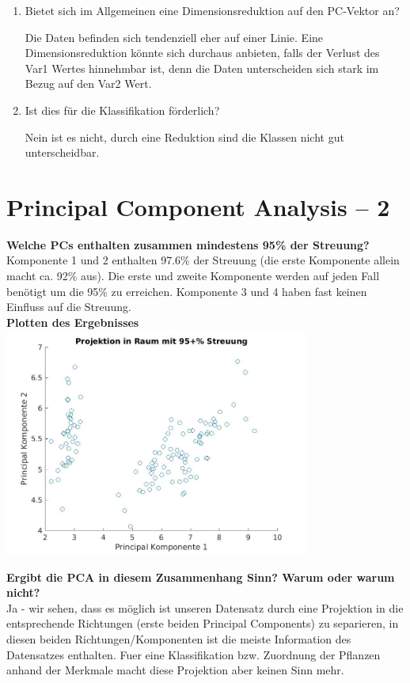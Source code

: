 \documentclass[a4paper]{scrartcl}
\begin{document}
\begin{enumerate}[(a)]
	\begin{enumerate}[1.]
		\item Bietet sich im Allgemeinen eine Dimensionsreduktion auf den PC-Vektor an?
		
		Die Daten befinden sich tendenziell eher auf einer Linie. Eine Dimensionsreduktion könnte sich durchaus anbieten, falls der Verlust des Var1 Wertes hinnehmbar ist, denn die Daten unterscheiden sich stark im Bezug auf den Var2 Wert.
		
		\item Ist dies für die Klassifikation förderlich?
		
		Nein ist es nicht, durch eine Reduktion sind die Klassen nicht gut unterscheidbar.
		
	\end{enumerate}
	
\end{enumerate}


\section{Principal Component Analysis – 2}

\textbf{Welche PCs enthalten zusammen mindestens  95\% der Streuung?}\\
Komponente 1 und 2 enthalten 97.6\% der Streuung (die erste Komponente allein macht  ca. 92\% aus).
Die erste und zweite Komponente werden auf jeden Fall benötigt um die 95\% zu erreichen. 
Komponente 3 und 4 haben fast keinen Einfluss auf die Streuung.\\


\textbf{Plotten des Ergebnisses}\\

\includegraphics[width=0.75\textwidth]{plots/plotresultE.jpg}

\textbf{Ergibt die PCA in diesem Zusammenhang Sinn? Warum oder warum nicht?}\\
Ja - wir sehen, dass es möglich ist unseren Datensatz durch eine Projektion in die entsprechende Richtungen (erste beiden Principal Components) zu separieren, in diesen beiden Richtungen/Komponenten ist die meiste Information des Datensatzes enthalten.
Fuer eine Klassifikation bzw. Zuordnung der Pflanzen anhand der Merkmale macht diese Projektion aber keinen Sinn mehr. 
   
\end{document}
